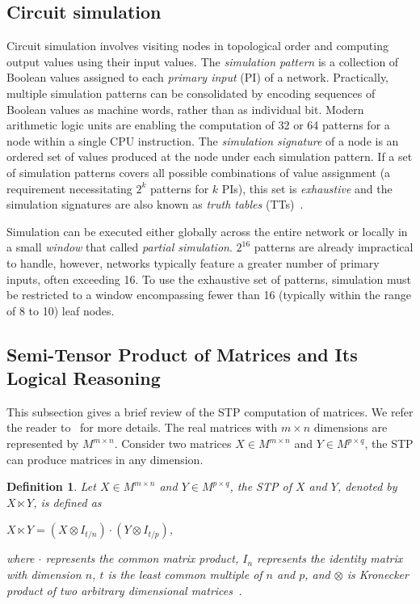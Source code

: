 \documentclass[conference]{IEEEtran}
\newtheorem{owndefinition}{Definition}		%
\begin{document}
\subsection{Circuit simulation}
\label{sec21}
Circuit simulation involves visiting nodes in topological order and computing output values using their input values.
The \emph{simulation pattern} is a collection of Boolean values assigned to each \emph{primary input} (PI) of a network.
Practically, multiple simulation patterns can be consolidated by encoding sequences of Boolean values as machine words, rather than as individual bit. 
Modern arithmetic logic units are enabling the computation of 32 or 64 patterns for a node within a single CPU instruction.
The \emph{simulation signature} of a node is an ordered set of values produced at the node under each simulation pattern. 
If a set of simulation patterns covers all possible combinations of value assignment (a requirement necessitating $2^k$ patterns for $k$ PIs), this set is \emph{exhaustive} and the simulation signatures are also known as \emph{truth tables} (TTs)~\cite{pri1}.

Simulation can be executed either globally across the entire network or locally in a small \emph{window} that called \emph{partial simulation}. 
$2^{16}$ patterns are already impractical to handle, however, networks typically feature a greater number of primary inputs, often exceeding 16. 
To use the exhaustive set of patterns, simulation must be restricted to a window encompassing fewer than 16 (typically within the range of 8 to 10) leaf nodes.

\subsection{Semi-Tensor Product of Matrices and Its Logical Reasoning}
\label{sec22}
This subsection gives a brief review of the STP computation of matrices.
We refer the reader to~\cite{pri2,pri21} for more details.
The real matrices with $m \times n$ dimensions are represented by $M^{m \times n}$.
Consider two matrices $X \in M^{m \times n}$ and $Y \in M^{p \times q}$, the STP can produce matrices in any dimension.

\begin{owndefinition}
\label{def1}
Let $X \in M^{m \times n}$ and $Y \in M^{p \times q}$, the STP of $X$ and $Y$, denoted by $X \ltimes Y$, is defined as
\begin{center}
$ X \ltimes Y = (X \otimes I_{t/n}) \cdot (Y \otimes I_{t/p})$,
\end{center}
where $\cdot$ represents the common matrix product, $I_n$ represents the identity matrix with dimension $n$, $t$ is the least common multiple of $n$ and $p$, and $\otimes$ is Kronecker product of two arbitrary dimensional matrices~\cite{pri3}.
\end{owndefinition}
\end{document}
